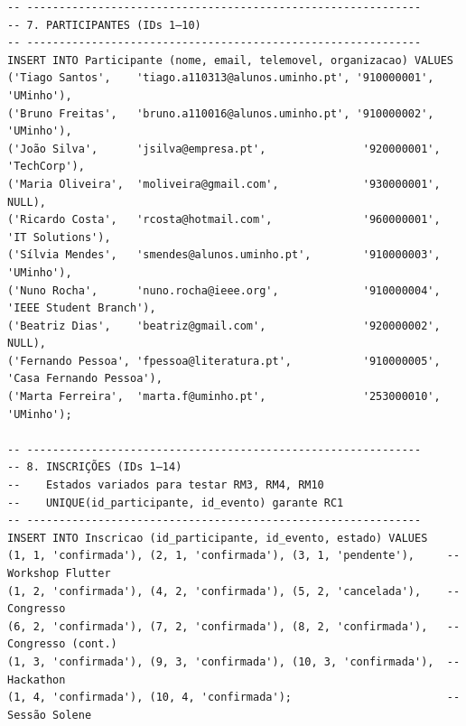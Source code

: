 \documentclass[runningheads]{llncs}
\begin{document}
\begin{small}
\begin{verbatim}
-- -------------------------------------------------------------
-- 7. PARTICIPANTES (IDs 1–10)
-- -------------------------------------------------------------
INSERT INTO Participante (nome, email, telemovel, organizacao) VALUES
('Tiago Santos',    'tiago.a110313@alunos.uminho.pt', '910000001', 'UMinho'),
('Bruno Freitas',   'bruno.a110016@alunos.uminho.pt', '910000002', 'UMinho'),
('João Silva',      'jsilva@empresa.pt',               '920000001', 'TechCorp'),
('Maria Oliveira',  'moliveira@gmail.com',             '930000001',  NULL),
('Ricardo Costa',   'rcosta@hotmail.com',              '960000001', 'IT Solutions'),
('Sílvia Mendes',   'smendes@alunos.uminho.pt',        '910000003', 'UMinho'),
('Nuno Rocha',      'nuno.rocha@ieee.org',             '910000004', 'IEEE Student Branch'),
('Beatriz Dias',    'beatriz@gmail.com',               '920000002',  NULL),
('Fernando Pessoa', 'fpessoa@literatura.pt',           '910000005', 'Casa Fernando Pessoa'),
('Marta Ferreira',  'marta.f@uminho.pt',               '253000010', 'UMinho');

-- -------------------------------------------------------------
-- 8. INSCRIÇÕES (IDs 1–14)
--    Estados variados para testar RM3, RM4, RM10
--    UNIQUE(id_participante, id_evento) garante RC1
-- -------------------------------------------------------------
INSERT INTO Inscricao (id_participante, id_evento, estado) VALUES
(1, 1, 'confirmada'), (2, 1, 'confirmada'), (3, 1, 'pendente'),     -- Workshop Flutter
(1, 2, 'confirmada'), (4, 2, 'confirmada'), (5, 2, 'cancelada'),    -- Congresso
(6, 2, 'confirmada'), (7, 2, 'confirmada'), (8, 2, 'confirmada'),   -- Congresso (cont.)
(1, 3, 'confirmada'), (9, 3, 'confirmada'), (10, 3, 'confirmada'),  -- Hackathon
(1, 4, 'confirmada'), (10, 4, 'confirmada');                        -- Sessão Solene


\end{verbatim}
\end{small}
\end{document}
